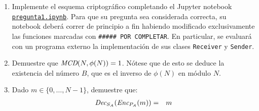    \begin{enumerate}
\item Implemente el esquema criptográfico completando el Jupyter
  notebook
  \href{https://github.com/IIC3253/2023/tree/main/tareas/tarea\%201/enunciado/questions/p1/pregunta1.ipynb}{\texttt{pregunta1.ipynb}}. Para
  que su pregunta sea considerada correcta, su notebook deberá correr
  de principio a fin habiendo modificado exclusivamente las funciones
  marcadas con \texttt{\#\#\#\#\# POR COMPLETAR}. En particular, se
  evaluará con un programa externo la implementación de sus clases
  \texttt{Receiver} y \texttt{Sender}.
  
  \item Demuestre que $\textit{MCD}(N, \phi(N)) = 1$. Nótese que de esto
    se deduce la existencia del número $B$, que es el inverso
    de $\phi(N)$ en módulo $N$.

\item Dado     $m \in \{0, \ldots, N-1\}$, demuestre que:
  \begin{eqnarray*}
    \textit{Dec}_{S_A}(\textit{Enc}_{P_A}(m)) &=& m
  \end{eqnarray*}
  \end{enumerate}
